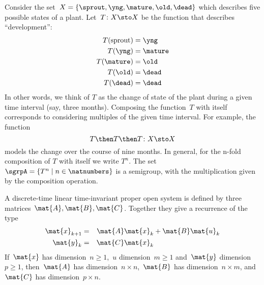 
\begin{example}
  \label{plant-trafo-semigroup}
  Consider the set~$X = \{ \sprout, \yng, \mature, \old, \dead \}$ which describes five possible states of a plant. Let~$T \colon X \sto X$ be the function that describes ``development'':
  \begin{align*}
    T(\text{sprout}) &=  \yng \\
    T(\yng) &=  \mature \\
    T(\mature) &=  \old \\
    T( \old) &= \dead \\
    T (\dead) &= \dead
  \end{align*}
  In other words, we think of $T$ as the change of state of the plant during a given time interval (say, three months).
  Composing the function~$T$ with itself corresponds to considering multiples of the given time interval.
  For example, the function
  \begin{equation*}
    T \then T \then T \colon X \sto X
  \end{equation*}
  models the change over the course of nine months.
  In general, for the n-fold composition of $T$ with itself we write $T^n$.
  The set~$\sgrpA = \{ T^n \mid n \in \natnumbers \}$ is a semigroup, with the multiplication given by the composition operation.
\end{example}

\label{ex:discrete-time-linear}
\begin{definition}
  \label{def:dicrete-time-linear-system}
  A discrete-time linear time-invariant proper open system is defined by three matrices~$\mat{A},\mat{B},\mat{C}$.
  Together they give a recurrence of the type
  \begin{equation}
    \label{eq:discrete-time-dynamics}
    \begin{aligned}
      \mat{x}_{k+1} &=& \mat{A} \mat{x}_k & + \mat{B} \mat{u}_k \\
      \mat{y}_{k}   &=& \mat{C} \mat{x}_k  \\
    \end{aligned}
  \end{equation}
  If~$\mat{x}$ has dimension~$n\geq1$,~$u$ dimension~$m\geq1$ and~$\mat{y}$ dimension~$p\geq1$, then~$\mat{A}$ has dimension~$n \times n$,~$\mat{B}$ has dimension~$n \times m$, and~$\mat{C}$ has dimension~$p \times n$.
\end{definition}

